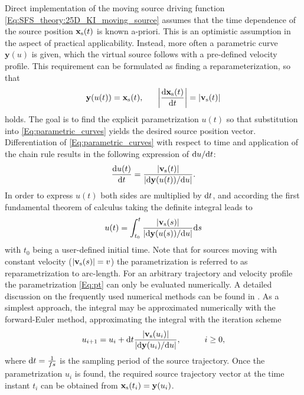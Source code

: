 Direct implementation of the moving source driving function \eqref{Eq:SFS_theory:25D_KI_moving_source} assumes that the time dependence of the source position $\mathbf{x}_{\mathrm{s}}(t)$ is known a-priori. 
This is an optimistic assumption in the aspect of practical applicability. 
Instead, more often a parametric curve $\mathbf{y}(u)$ is given, which the virtual source follows with a pre-defined velocity profile.
This requirement can be formulated as finding a reparameterization, so that 
\begin{equation}
\mathbf{y}(u(t)) = \mathbf{x}_{\mathrm{s}}(t), \hspace{6mm} \left| \frac{\mathrm{d} \mathbf{x}_{\mathrm{s}}(t)}{\mathrm{d} t} \right| = |\mathbf{v}_{\mathrm{s}}(t)| 
\label{Eq:parametric_curves}
\end{equation}
holds. 
The goal is to find the explicit parametrization $u(t)$ so that substitution into \eqref{Eq:parametric_curves} yields the desired source position vector.
\NewL
Differentiation of \eqref{Eq:parametric_curves} with respect to time and application of the chain rule results in the following expression of $\mathrm{d} u / \mathrm{d} t$:
%
\begin{equation}
 \frac{\mathrm{d} u(t) }{\mathrm{d} t} = \frac{|\mathbf{v}_{\mathrm{s}}(t)|}{\left| \mathrm{d} \mathbf{y}(u(t)) / \mathrm{d} u \right|}.
\end{equation}
In order to express $u(t)$ both sides are multiplied by $\mathrm{d} t$, and according the first fundamental theorem of calculus taking the definite integral leads to
\begin{equation}
u(t) = \int_{t_0}^{t} \frac{|\mathbf{v}_{\mathrm{s}}(s)|}{\left| \mathrm{d} \mathbf{y}(u(s)) / \mathrm{d} u \right|} \mathrm{d} s
\label{Eq:pt}
\end{equation}
with $t_0$ being a user-defined initial time.
Note that for sources moving with constant velocity ($|\mathbf{v}_{\mathrm{s}}(s)| = v$) the parametrization is referred to as reparametrization to arc-length.
\NewL
For an arbitrary trajectory and velocity profile the parametrization \eqref{Eq:pt} can only be evaluated numerically.
A detailed discussion on the frequently used numerical methods can be found in \cite{Parent2012}.
As a simplest approach, the integral may be approximated numerically with the forward-Euler method, approximating the integral with the iteration scheme
\begin{equation}
u_{i+1} = u_i + \td t \frac{|\vvs(u_i)|}{ | \td \mathbf{y}(u_i)/\td u | }, \hspace{10mm} i \geq 0,
\end{equation}
where $\mathrm{d} t = \frac{1}{fs}$ is the sampling period of the source trajectory.
Once the parametrization $u_i$ is found, the required source trajectory vector at the time instant $t_i$ can be obtained from $\mathbf{x}_{\mathrm{s}}(t_i) = \mathbf{y}(u_i)$. 

